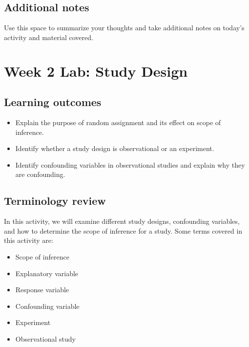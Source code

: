 \documentclass[
]{report}
\begin{document}
\hypertarget{additional-notes-2}{%
\subsection{Additional notes}\label{additional-notes-2}}

Use this space to summarize your thoughts and take additional notes on today's activity and material covered.

\newpage

\hypertarget{week-2-lab-study-design}{%
\section{Week 2 Lab: Study Design}\label{week-2-lab-study-design}}


\hypertarget{learning-outcomes-3}{%
\subsection{Learning outcomes}\label{learning-outcomes-3}}

\begin{itemize}
\item
  Explain the purpose of random assignment and its effect on scope of inference.
\item
  Identify whether a study design is observational or an experiment.
\item
  Identify confounding variables in observational studies and explain why they are confounding.
\end{itemize}

\hypertarget{terminology-review-3}{%
\subsection{Terminology review}\label{terminology-review-3}}

In this activity, we will examine different study designs, confounding variables, and how to determine the scope of inference for a study. Some terms covered in this activity are:

\begin{itemize}
\item
  Scope of inference
\item
  Explanatory variable
\item
  Response variable
\item
  Confounding variable
\item
  Experiment
\item
  Observational study
\end{itemize}
\end{document}
